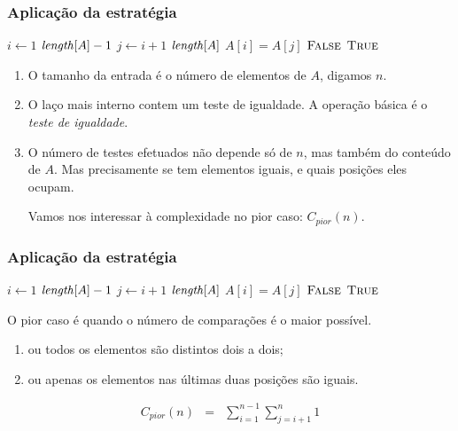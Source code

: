 \documentclass[handout]{beamer}
\begin{document}
\begin{frame}
\frametitle{Aplicação da estratégia}

\begin{small}
\begin{codebox}
\li \For $i \gets 1$ \To $\id{length}[A]-1$
\li \Do
\li   \For $j \gets i+1$ \To $\id{length}[A]$
\li   \Do
\li   \If $A[i] = A[j]$
\li     \Then
          \Return $\textnormal{\scshape False}$
        \End    
      \End    
    \End    
\li \Return $\textnormal{\scshape True}$
\end{codebox}
\end{small}

\begin{enumerate}
\item O tamanho da entrada é o número de elementos de $A$, digamos $n$.
\item O laço mais interno contem um teste de igualdade. A operação básica é o \emph{teste de igualdade}.
\item O número de testes efetuados não depende só de $n$, mas também do
  conteúdo de $A$. Mas precisamente se tem elementos iguais, e quais
  posições eles ocupam.

  Vamos nos interessar à complexidade \alert{no pior caso}: $C_{\textit{pior}}(n)$.
\end{enumerate}
\end{frame}

\begin{frame}
\frametitle{Aplicação da estratégia}

\begin{small}
\begin{codebox}
\li \For $i \gets 1$ \To $\id{length}[A]-1$
\li \Do
\li   \For $j \gets i+1$ \To $\id{length}[A]$
\li   \Do
\li     \If $A[i] = A[j]$
\li     \Then
          \Return $\textnormal{\scshape False}$
        \End    
      \End    
    \End    
\li \Return $\textnormal{\scshape True}$
\end{codebox}
\end{small}

O pior caso é quando o número de comparações é o maior possível.
\begin{enumerate}
\item ou todos os elementos são distintos dois a dois;
\item ou apenas os elementos nas últimas duas posições são iguais.
\end{enumerate}
\begin{eqnarray*}
C_{\textit{pior}}(n) & = & \sum_{i = 1}^{n-1} \sum_{j = i+1}^{n} 1
\end{eqnarray*}
\end{frame}
\end{document}
